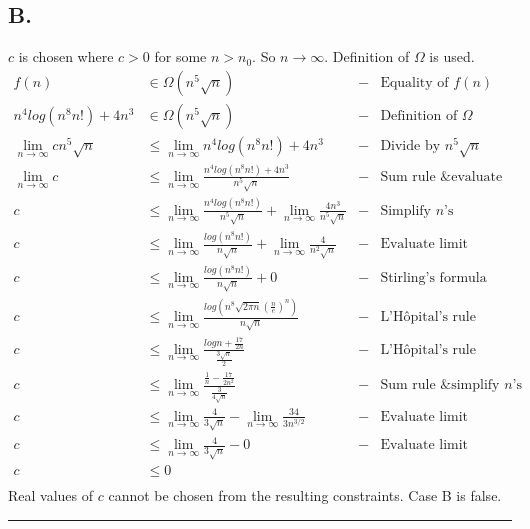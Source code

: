 \documentclass{article}
\begin{document}
\subsection*{B.}

$c$ is chosen where $c > 0$ for some $n > n_{0}$. So $n \to \infty$. Definition of $\Omega$ is used. 
\begingroup
\allowdisplaybreaks
\addtolength{\jot}{0.5em}
\begin{align*}
f(n) &\in \Omega(n^{5}\sqrt{n}) &-& \text{Equality of } f(n) \\
n^{4}log(n^{8}n!) + 4n^{3} &\in \Omega(n^{5}\sqrt{n}) &-& \text{Definition of } \Omega \\
\lim _{n \to \infty } c n^{5}\sqrt{n} &\le \lim _{n \to \infty } n^{4}log(n^{8}n!) + 4n^{3} &-& \text{Divide by } n^{5}\sqrt{n} \\
\lim _{n \to \infty } c &\le \lim _{n \to \infty } \frac{n^{4}log(n^{8}n!) + 4n^{3}}{n^{5}\sqrt{n}} &-& \text{Sum rule \& evaluate limit} \\
c &\le \lim _{n \to \infty } \frac{n^{4}log(n^{8}n!)} {n^{5}\sqrt{n}} + \lim _{n \to \infty } \frac{4n^{3}} {n^{5}\sqrt{n}} &-& \text{Simplify } n \text{'s} \\
c &\le \lim _{n \to \infty } \frac{log(n^{8}n!)} {n\sqrt{n}} + \lim _{n \to \infty } \frac{4} {n^{2}\sqrt{n}} &-& \text{Evaluate limit} \\
c &\le \lim _{n \to \infty } \frac{log(n^{8}n!)} {n\sqrt{n}} + 0 &-& \text{Stirling's formula} \\
c &\le \lim _{n \to \infty } \frac{log\left( n^{8}\sqrt{2\pi n}\left(\frac{n}{e}\right)^{n}\right)} {n\sqrt{n}} &-& \text{L'Hôpital's rule} \\
c &\le \lim _{n \to \infty } \frac {log n + \frac{17}{2n}} {\frac{3\sqrt{n}} {2}} &-& \text{L'Hôpital's rule} \\
c &\le \lim _{n \to \infty } \frac{\frac{1} {n} - \frac{17}{2n^{2}}} {\frac{3} {4\sqrt{n}} } &-& \text{Sum rule \& simplify } n \text{'s} \\
c &\le \lim _{n \to \infty } \frac{4} {3\sqrt{n}}  - \lim _{n \to \infty } \frac{34} {3 n^{3/2}} &-& \text{Evaluate limit} \\
c &\le \lim _{n \to \infty } \frac{4} {3\sqrt{n}}  - 0 &-& \text{Evaluate limit} \\
c &\le 0 && \text{} \\
\end{align*}
\endgroup
Real values of $c$ cannot be chosen from the resulting constraints. Case B is false. \\ 
\par\noindent\rule{\textwidth}{0.7pt}
\end{document}
